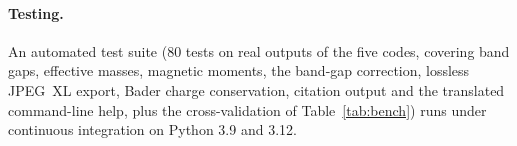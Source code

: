 \paragraph{Testing.} An automated test suite (80  tests on real outputs of the five codes, covering band gaps, effective masses, magnetic moments, the band-gap correction, lossless JPEG~XL export, Bader charge conservation, citation output and the translated command-line help, plus the cross-validation of Table~\ref{tab:bench}) runs under continuous integration on Python 3.9 and 3.12.

